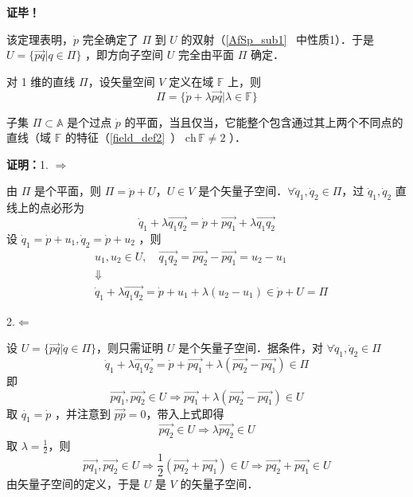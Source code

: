 \textbf{证毕！}

该定理表明，$\dot p$ 完全确定了 $\Pi$ 到 $U$ 的双射（\autoref{AfSp_sub1}~ 中性质1）．于是 $U=\{\overrightarrow{pq}|q\in \Pi\}$ ，即方向子空间 $U$ 完全由平面 $\Pi$ 确定．

对 1 维的直线 $\Pi$，设矢量空间 $V$ 定义在域 $\mathbb F$ 上，则
\begin{equation}\label{SAfSp_eq4}
\Pi=\{\dot p+\lambda\overrightarrow{pq}|\lambda\in \mathbb F\}
\end{equation}
\begin{theorem}{}
子集 $\Pi \subset\mathbb A$ 是个过点 $\dot p$ 的平面，当且仅当，它能整个包含通过其上两个不同点的直线（域 $\mathbb F$ 的特征（\autoref{field_def2}~） $\mathrm{ch}\,\mathbb F\neq 2$ ）．
\end{theorem}
\textbf{证明：}1.
$\Rightarrow$

由 $\Pi$ 是个平面，则 $\Pi=\dot p+U$，$U\in V$ 是个矢量子空间．$\forall\dot q_1,\dot q_2\in \Pi$，过 $\dot q_1,\dot q_2$ 直线上的点必形为
\begin{equation}
\dot q_1+\lambda\overrightarrow{q_1q_2}=\dot p+\overrightarrow{pq_1}+\lambda\overrightarrow{q_1q_2}
\end{equation}
设 $\dot q_1=\dot p+u_1,\dot q_2=\dot p+u_2$ ，则
\begin{equation}
\begin{aligned}
&u_1,u_2\in U,\quad \overrightarrow{q_1q_2}=\overrightarrow{pq_2}-\overrightarrow{pq_1}=u_2-u_1\\
&\Downarrow\\
&\dot q_1+\lambda\overrightarrow{q_1q_2}=\dot p+u_1+\lambda(u_2-u_1)\in\dot p+U=\Pi
\end{aligned}
\end{equation}

2.$\Leftarrow$

设 $U=\{\overrightarrow{pq}|\dot q\in \Pi\}$，则只需证明 $U$ 是个矢量子空间．据条件，对 $\forall \dot q_1,\dot q_2\in\Pi$
\begin{equation}
\dot q_1+\lambda\overrightarrow{q_1q_2}=\dot p+\overrightarrow{pq_1}+\lambda(\overrightarrow{pq_2}-\overrightarrow{pq_1})\in\Pi
\end{equation}
 即
 \begin{equation}
 \overrightarrow{pq_1},\overrightarrow{pq_2}\in U\Rightarrow \overrightarrow{pq_1}+\lambda(\overrightarrow{pq_2}-\overrightarrow{pq_1})\in U
 \end{equation}
 取 $\dot{q_1}=\dot{p}$ ，并注意到 $\overrightarrow{pp}=0$，带入上式即得 
 \begin{equation}\label{SAfSp_eq2}
 \overrightarrow{pq_2}\in U\Rightarrow\lambda\overrightarrow{pq_2}\in U 
 \end{equation}
取 $\lambda=\frac{1}{2}$，则 
\begin{equation}
\overrightarrow{pq_1},\overrightarrow{pq_2}\in U\Rightarrow \frac{1}{2}(\overrightarrow{pq_2}+\overrightarrow{pq_1})\in U\Rightarrow \overrightarrow{pq_2}+\overrightarrow{pq_1}\in U
\end{equation}
由矢量子空间的定义，于是 $U$ 是 $V$ 的矢量子空间．

